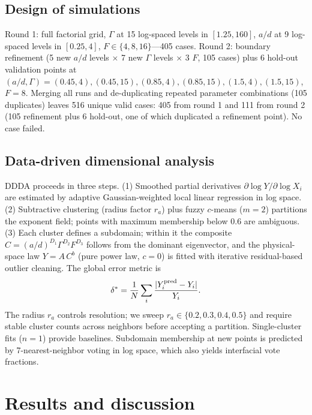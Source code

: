 \documentclass[aps,pre,twocolumn,superscriptaddress,floatfix]{revtex4-2}
\begin{document}
\subsection{Design of simulations}
Round 1: full factorial grid, $\Gamma$ at 15 log-spaced levels in $[1.25,160]$, $a/d$ at 9 log-spaced levels in $[0.25,4]$, $F\in\{4,8,16\}$---405 cases. Round 2: boundary refinement (5 new $a/d$ levels $\times$ 7 new $\Gamma$ levels $\times$ 3 $F$, 105 cases) plus 6 hold-out validation points at $(a/d,\Gamma)=(0.45,4),(0.45,15),(0.85,4),(0.85,15),(1.5,4),(1.5,15)$, $F=8$. Merging all runs and de-duplicating repeated parameter combinations (105 duplicates) leaves 516 unique valid cases: 405 from round 1 and 111 from round 2 (105 refinement plus 6 hold-out, one of which duplicated a refinement point). No case failed.

\subsection{Data-driven dimensional analysis}
DDDA proceeds in three steps. (1) Smoothed partial derivatives $\partial\log Y/\partial\log X_i$ are estimated by adaptive Gaussian-weighted local linear regression in log space. (2) Subtractive clustering (radius factor $r_a$) plus fuzzy $c$-means ($m=2$) partitions the exponent field; points with maximum membership below 0.6 are ambiguous. (3) Each cluster defines a subdomain; within it the composite $C=(a/d)^{D_1}\Gamma^{D_2}F^{D_3}$ follows from the dominant eigenvector, and the physical-space law $Y=A\,C^{b}$ (pure power law, $c=0$) is fitted with iterative residual-based outlier cleaning. The global error metric is
\begin{equation}
\delta^*=\frac1N\sum_i\frac{|Y_i^{\rm pred}-Y_i|}{Y_i}.
\end{equation}
The radius $r_a$ controls resolution; we sweep $r_a\in\{0.2,0.3,0.4,0.5\}$ and require stable cluster counts across neighbors before accepting a partition. Single-cluster fits ($n=1$) provide baselines. Subdomain membership at new points is predicted by 7-nearest-neighbor voting in log space, which also yields interfacial vote fractions.

\section{Results and discussion}
\label{sec:results}
\end{document}
